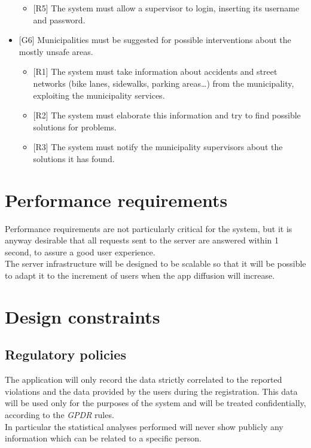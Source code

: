\documentclass[a4paper]{report}
\begin{document}
\begin{itemize}
\begin{itemize}
\item {[R5]}	The system must allow a supervisor to login, inserting its username and password.
\end{itemize}
\item  {[G6]} Municipalities must be suggested for possible interventions about the mostly unsafe areas.
\begin{itemize}
\item {[R1]}	The system must take information about accidents and street networks (bike lanes, sidewalks, parking areas…) from the municipality, exploiting the municipality services.
\item {[R2]}	The system must elaborate this information and try to find possible solutions for problems.
\item {[R3]}	The system must notify the municipality supervisors about the solutions it has found.
\end{itemize}
\end{itemize}


\section{Performance requirements}
Performance requirements are not particularly critical for the system, but it is anyway desirable that all requests sent to the server are answered within 1 second, to assure a good user experience. \\
The server infrastructure will be designed to be scalable so that it will be possible to adapt it to the increment of users when the app diffusion will increase.
\section{Design constraints}
\subsection{Regulatory policies}
The application will only record the data strictly correlated to the reported violations and the data provided by the users during the registration. This data will be used only for the purposes of the system and will be treated confidentially, according to the \textit{GPDR} rules.\\
In particular the statistical analyses performed will never show publicly any information which can be related to a specific person.
\end{document}
